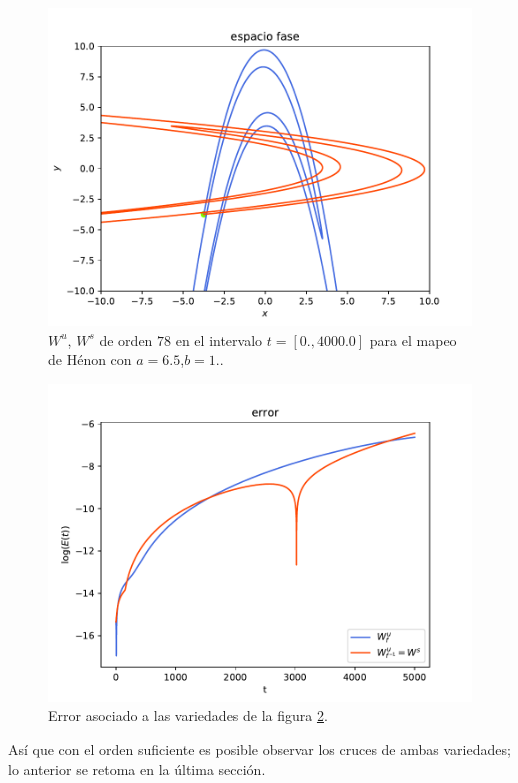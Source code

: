 \begin{figure}[H]
\centering
\includegraphics[scale=0.7]{h65}
\caption{$W^{u}$, $W^{s}$ de orden $78$ en el intervalo $t=[0.,4000.0]$ para el mapeo de Hénon con $a=6.5$,$b=1.$.}
\label{Henon3}
\end{figure}

\begin{figure}[H]
\centering
\includegraphics[scale=0.6]{errorH65}
\caption{Error asociado a las variedades de la figura \ref{Henon3}.}
\label{Henon3}
\end{figure}


Así que con el orden suficiente es posible observar los cruces de ambas variedades; lo anterior se retoma en la última sección. 

